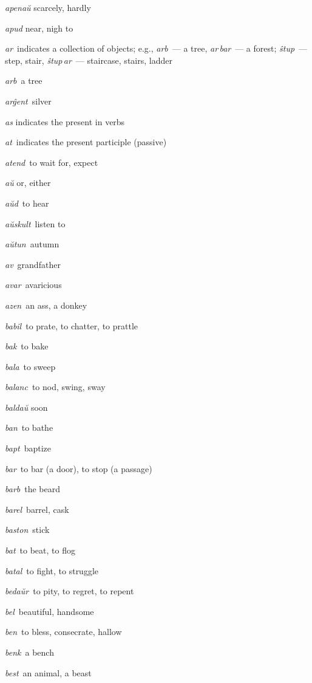 \begin{landscape}
\begin{multicols}{5}
\begin{outdent}{1em}
\emph{apenaŭ} scarcely, hardly

\emph{apud} near, nigh to

\emph{ar\,} indicates a collection of objects; e.g., \emph{arb\,} — a tree, \emph{ar\,bar\,} — a forest; \emph{ŝtup\,} — step, stair, \emph{ŝtup\,ar\,} — staircase, stairs, ladder

\emph{arb\,} a tree

\emph{arĝent\,} silver

\emph{as} indicates the present in verbs

\emph{at\,} indicates the present participle (passive)

\emph{atend\,} to wait for, expect

\emph{aŭ} or, either

\emph{aŭd\,} to hear

\emph{aŭskult\,} listen to

\emph{aŭtun\,} autumn

\emph{av\,} grandfather

\emph{avar\,} avaricious

\emph{azen\,} an ass, a donkey
\end{outdent}


\begin{outdent}{1em}
\emph{babil\,} to prate, to chatter, to prattle

\emph{bak\,} to bake

\emph{bala\,} to sweep

\emph{balanc\,} to nod, swing, sway

\emph{baldaŭ} soon

\emph{ban\,} to bathe

\emph{bapt\,} baptize

\emph{bar\,} to bar (a door), to stop (a passage)

\emph{barb\,} the beard

\emph{barel\,} barrel, cask

\emph{baston\,} stick

\emph{bat\,} to beat, to flog

\emph{batal\,} to fight, to struggle

\emph{bedaŭr\,} to pity, to regret, to repent

\emph{bel\,} beautiful, handsome

\emph{ben\,} to bless, consecrate, hallow

\emph{benk\,} a bench

\emph{best\,} an animal, a beast


\end{outdent}
\end{multicols}
\end{landscape}
